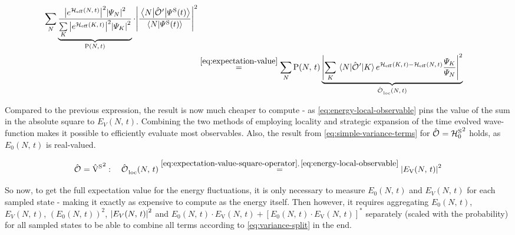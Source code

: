 \begin{equation}
\begin{split}
        \lsum[N]
        \underbrace{\frac{
            \absSquare{e^{\HeffOft}} \absSquare{\psiN} 
        }{
            \lsum[K] \absSquare{e^{\HeffOft[K]}} \absSquare{\psiN[K]} 
        }}_{\probabilityOf{N}{t}} \cdot 
        \absSquare{\frac{\bracketHelper{N}{{\ObservableOp{}'}}{\psiOfT[\schroedingerPicture]}}{\braketHelper{N}{\psiOfT[\schroedingerPicture]}}}\\
        &\stackrel{\ref{eq:expectation-value}}{=} \lsum[N]
        \probabilityOf{N}{t}
        \underbrace{\absSquare{\lsum[K] \bracketHelper{N}{{\ObservableOp{}'}}{K} e^{\HeffOft[K]-\HeffOft[N]}
        \frac{
            \psiN[K]
        }{
            \psiN[N]
        }}}_{\localObservable{N}{t}}
    \end{split}
\end{equation}

Compared to the previous expression, the result is now much cheaper to compute - as \autoref{eq:energy-local-observable} pins the value of the sum in the absolute square to $E_V(N,\,t)$.
Combining the two methods of employing locality and strategic expansion of the time evolved wave-function makes it possible to efficiently evaluate most observables.
Also, the result from \autoref{eq:simple-variance-terms} for $\ObservableOp = {\HzeroHamiltonian[\schroedingerPicture]}^2$ holds, as $E_0(N,\,t)$ is real-valued.

\begin{equation}
    \label{eq:v-squared-variance-last-term}
        \ObservableOp ={\Vhamiltonian[\schroedingerPicture]}^2: \quad \localObservable{N}{t} \stackrel{\ref{eq:expectation-value-square-operator},\,\ref{eq:energy-local-observable}}{=}
        \absSquare{E_\text{V}(N,\,t)}
\end{equation}

So now, to get the full expectation value for the energy fluctuations, it is only necessary to measure $E_0(N,\,t)$ and $E_V(N,\,t)$ for each sampled state - making it exactly as expensive to compute as the energy itself.
Then however, it requires aggregating $E_0(N,\,t)$, $E_V(N,\,t)$, $\left(E_0(N,\,t)\right)^2$, $\absSquare{E_V(N,\,t)}$ and $E_0(N,\,t) \cdot E_\text{V}(N,\,t) + \left[E_0(N,\,t) \cdot E_\text{V}(N,\,t) \right]^\ast$ separately (scaled with the probability) for all sampled states to be able to combine all terms according to \autoref{eq:variance-split} in the end.